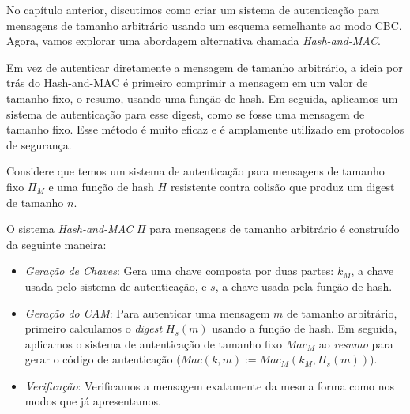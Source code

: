 No capítulo anterior, discutimos como criar um sistema de autenticação para mensagens de tamanho arbitrário usando um esquema semelhante ao modo CBC.
Agora, vamos explorar uma abordagem alternativa chamada {\em Hash-and-MAC}.

Em vez de autenticar diretamente a mensagem de tamanho arbitrário, a ideia por trás do Hash-and-MAC é primeiro comprimir a mensagem em um valor de tamanho fixo, o resumo, usando uma função de hash.
Em seguida, aplicamos um sistema de autenticação para esse digest, como se fosse uma mensagem de tamanho fixo.
Esse método é muito eficaz e é amplamente utilizado em protocolos de segurança.

Considere que temos um sistema de autenticação para mensagens de tamanho fixo $\Pi_M$ e uma função de hash $H$ resistente contra colisão que produz um digest de tamanho $n$.

O sistema \textit{Hash-and-MAC} $\Pi$ para mensagens de tamanho arbitrário é construído da seguinte maneira:

\begin{itemize}
\item[] {\em Geração de Chaves}:
  Gera uma chave composta por duas partes: $k_M$, a chave usada pelo sistema de autenticação, e $s$, a chave usada pela função de hash. 
  
\item[] {\em Geração do CAM}:
  Para autenticar uma mensagem $m$ de tamanho arbitrário, primeiro calculamos o \textit{digest} $H_s(m)$ usando a função de hash.
  Em seguida, aplicamos o sistema de autenticação de tamanho fixo $Mac_M$ ao \textit{resumo} para gerar o código de autenticação ($Mac(k, m) := Mac_M(k_M, H_s(m))$).
  
\item[] {\em Verificação}:
  Verificamos a mensagem exatamente da mesma forma como nos modos que já apresentamos.
\end{itemize}


